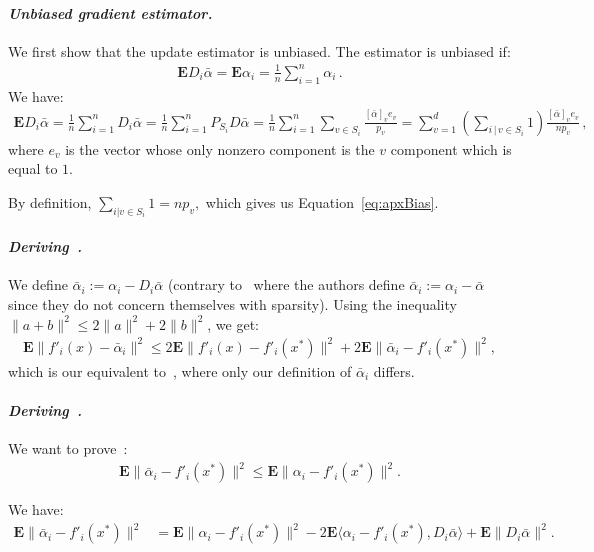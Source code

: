 \documentclass[twoside, 11pt]{article}
\newcommand{\Econd}{\mathbf{E}}
\begin{document}
	\paragraph{\textit{Unbiased gradient estimator.}}
	We first show that the update estimator is unbiased.
	The estimator is unbiased if:
	\begin{align}\label{eq:apxBias}
	\Econd D_i \bar \alpha = \Econd \alpha_i = \frac{1}{n}\sum_{i=1}^n \alpha_i \, .
	\end{align}
	We have:
	\begin{align*}
	\Econd D_i \bar \alpha
	= \frac{1}{n} \sum_{i=1}^n D_i \bar \alpha
	= \frac{1}{n} \sum_{i=1}^n P_{S_i} D \bar \alpha
	= \frac{1}{n} \sum_{i=1}^n \sum_{v \in S_i} \frac{[\bar \alpha]_v e_v}{p_v}
	= \sum_{v=1}^{d} \left( \sum_{i\, | \, v \in S_i} 1 \right) \frac{[\bar \alpha]_v e_v}{n p_v}  \, ,
	\end{align*}
	where $e_v$ is the vector whose only nonzero component is the $v$ component which is equal to $1$.

	By definition, $\sum_{i|v \in S_i} 1 = n p_v,$ which gives us Equation~\eqref{eq:apxBias}.

	\paragraph{\textit{Deriving~\citet[Equation 6]{qsaga}.}}
	We define $\bar \alpha_i := \alpha_i - D_i\bar \alpha$ (contrary to~\citet{qsaga} where the authors define $\bar \alpha_i := \alpha_i - \bar \alpha$ since they do not concern themselves with sparsity).
	Using the inequality $\|a+b\|^2 \leq 2 \|a\|^2 + 2 \|b\|^2$, we get:
	\begin{align}\label{eq:apxhof6}
	\Econd \|f'_i(x) - \bar \alpha_i\|^2
	\leq 2\Econd \|f'_i(x) -f'_i(x^*)\|^2 + 2\Econd \|\bar\alpha_i -f'_i(x^*)\|^2,
	\end{align}
	which is our equivalent to~\citet[Eq. 6]{qsaga}, where only our definition of $\bar \alpha_i$ differs.

	\paragraph{\textit{Deriving~\citet[Equation 9]{qsaga}.}}
	We want to prove~\citet[Eq. 9]{qsaga}:
	\begin{align}
	\Econd \|\bar \alpha_i -f'_i(x^*)\|^2
	\leq \Econd \|\alpha_i -f'_i(x^*)\|^2 .
	\end{align}

	We have:
	\begin{align} \label{eq:alphaiBarVariance}
	\Econd \|\bar \alpha_i -f'_i(x^*)\|^2
	&= \Econd \|\alpha_i -f'_i(x^*)\|^2
	-2\Econd \langle \alpha_i - f'_i(x^*), D_i \bar \alpha \rangle + \Econd\|D_i\bar \alpha\|^2 .
	\end{align}
\end{document}
